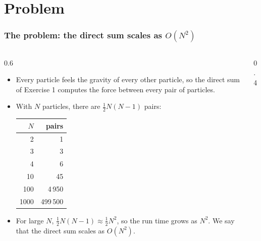
\subtitle{Lecture 11: The Barnes--Hut Algorithm}



\begin{frame}
  \titlepage
\end{frame}


\section{Problem}

\begin{frame}
  \frametitle{The problem: the direct sum scales as $O(N^2)$}
  \begin{columns}[T]
    \begin{column}{0.6\textwidth}
      \begin{itemize}
        \item Every particle feels the gravity of every other particle, so the direct sum of Exercise 1 computes the force between every pair of particles.
        \item With $N$ particles, there are $\frac{1}{2}N(N-1)$ pairs:

          \vspace*{1mm}
          \centering
          \small
          \begin{tabular}{rr}
            $N$ & pairs \\
            \hline
            2 & 1 \\
            3 & 3 \\
            4 & 6 \\
            10 & 45 \\
            100 & 4\,950 \\
            1000 & 499\,500 \\
          \end{tabular}

        \item For large $N$, $\frac{1}{2}N(N-1) \approx \frac{1}{2}N^2$, so the run time grows as $N^2$. We say that the direct sum scales as $O(N^2)$.
      \end{itemize}
    \end{column}

    \begin{column}{0.4\textwidth}
      \centering
      \vspace*{4mm}
    \end{column}
  \end{columns}
\end{frame}



